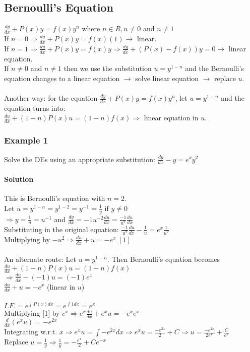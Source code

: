 \documentclass{article}
\begin{document}
\subsection{Bernoulli's Equation}
$\frac{dy}{dx}+P(x)y=f(x)y^n$ where $n\in R, n\neq0$ and $n\neq1$
\\If $n=0\Rightarrow\frac{dy}{dx}+P(x)y=f(x)(1)\rightarrow$ linear.
\\If $n=1\Rightarrow\frac{dy}{dx}+P(x)y=f(x)y\Rightarrow\frac{dy}{dx}+(P(x)-f(x))y=0\rightarrow$ linear equation.
\\If $n\neq0$ and $n\neq1$ then we use the substitution $u=y^{1-n}$ and the Bernoulli's equation changes to a linear equation $\to$ solve linear equation $\to$ replace $u$.
\\\\Another way: for the equation $\frac{dy}{dx}+P(x)y=f(x)y^n$, let $u=y^{1-n}$ and the equation turns into:
\\$\frac{du}{dx}+(1-n)P(x)u=(1-n)f(x)\Rightarrow$ linear equation in $u$.

\subsubsection{Example 1}
Solve the DEs using an appropriate substitution: $\frac{dy}{dx}-y=e^xy^2$
\paragraph{Solution} This is Bernoulli's equation with $n=2$.
\\Let $u=y^{1-n}=y^{1-2}=y^{-1}=\frac{1}{y}$ if $y\neq0$
\\$\Rightarrow y=\frac{1}{u}=u^{-1}$ and $\frac{dy}{dx}=-1u^{-2}\frac{du}{dx}=\frac{-1}{u^2}\frac{du}{dx}$
\\Substituting in the original equation: $\frac{-1}{u^2}\frac{du}{dx}-\frac{1}{u}=e^x\frac{1}{u^2}$
\\Multiplying by $-u^2\Rightarrow\frac{du}{dx}+u=-e^x\;[1]$
\\\\An alternate route: Let $u=y^{1-n}$. Then Bernoulli's equation becomes $\frac{du}{dx}+(1-n)P(x)u=(1-n)f(x)$
\\$\Rightarrow\frac{du}{dx}-(-1)u=(-1)e^x$
\\$\frac{du}{dx}+u=-e^x$ (linear in $u$)
\\\\$I.F.=e^{\int P(x)dx}=e^{\int 1dx}=e^x$
\\Multiplying [1] by $e^x\Rightarrow e^x\frac{du}{dx}+e^xu=-e^xe^x$
\\$\frac{d}{dx}(e^xu)=-e^{2x}$
\\Integrating w.r.t. $x\Rightarrow e^xu=\int -e^{2x}dx\Rightarrow e^xu=\frac{-e^{2x}}{2}+C\Rightarrow u=\frac{-e^{2x}}{2e^x}+\frac{C}{e^x}$
\\Replace $u=\frac{1}{y}\Rightarrow\frac{1}{y}=-\frac{e^x}{2}+Ce^{-x}$
\end{document}
